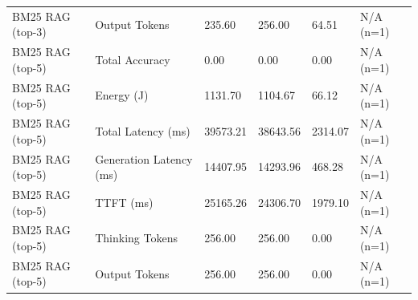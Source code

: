 \begin{table}
\begin{tabular}{llllll}
BM25 RAG (top-3) & Output Tokens & 235.60 & 256.00 & 64.51 & N/A (n=1) \\
BM25 RAG (top-5) & Total Accuracy & 0.00 & 0.00 & 0.00 & N/A (n=1) \\
BM25 RAG (top-5) & Energy (J) & 1131.70 & 1104.67 & 66.12 & N/A (n=1) \\
BM25 RAG (top-5) & Total Latency (ms) & 39573.21 & 38643.56 & 2314.07 & N/A (n=1) \\
BM25 RAG (top-5) & Generation Latency (ms) & 14407.95 & 14293.96 & 468.28 & N/A (n=1) \\
BM25 RAG (top-5) & TTFT (ms) & 25165.26 & 24306.70 & 1979.10 & N/A (n=1) \\
BM25 RAG (top-5) & Thinking Tokens & 256.00 & 256.00 & 0.00 & N/A (n=1) \\
BM25 RAG (top-5) & Output Tokens & 256.00 & 256.00 & 0.00 & N/A (n=1) \\
\bottomrule
\end{tabular}
\end{table}
